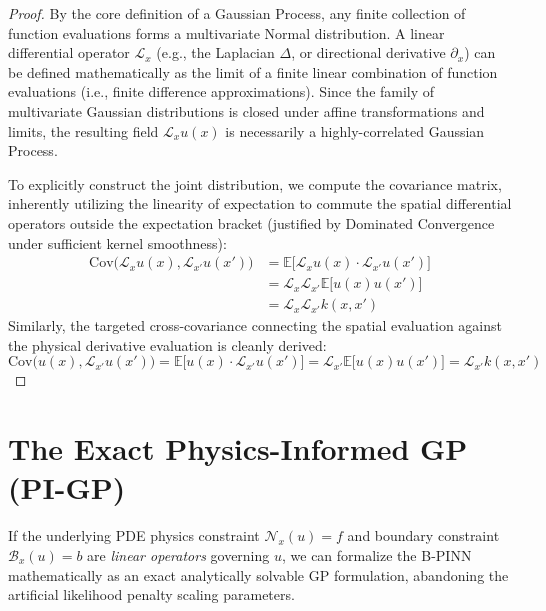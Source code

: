 \documentclass[11pt]{article}
\begin{document}
\begin{proof}
By the core definition of a Gaussian Process, any finite collection of function evaluations forms a multivariate Normal distribution. A linear differential operator $\mathcal{L}_x$ (e.g., the Laplacian $\Delta$, or directional derivative $\partial_x$) can be defined mathematically as the limit of a finite linear combination of function evaluations (i.e., finite difference approximations). Since the family of multivariate Gaussian distributions is closed under affine transformations and limits, the resulting field $\mathcal{L}_x u(x)$ is necessarily a highly-correlated Gaussian Process.

To explicitly construct the joint distribution, we compute the covariance matrix, inherently utilizing the linearity of expectation to commute the spatial differential operators outside the expectation bracket (justified by Dominated Convergence under sufficient kernel smoothness):
\begin{align}
\text{Cov}\big(\mathcal{L}_x u(x), \mathcal{L}_{x'} u(x')\big) &= \mathbb{E}\big[\mathcal{L}_x u(x) \cdot \mathcal{L}_{x'} u(x')\big] \nonumber \\
&= \mathcal{L}_x \mathcal{L}_{x'} \mathbb{E}\big[u(x) u(x')\big] \nonumber \\
&= \mathcal{L}_x \mathcal{L}_{x'} k(x, x') \label{eq:physics_covariance}
\end{align}
Similarly, the targeted cross-covariance connecting the spatial evaluation against the physical derivative evaluation is cleanly derived:
\begin{equation}
\text{Cov}\big(u(x), \mathcal{L}_{x'} u(x')\big) = \mathbb{E}\big[u(x) \cdot \mathcal{L}_{x'} u(x')\big] = \mathcal{L}_{x'} \mathbb{E}\big[u(x) u(x')\big] = \mathcal{L}_{x'} k(x, x') \label{eq:cross_covariance}
\end{equation}
\end{proof}

\section{The Exact Physics-Informed GP (PI-GP)}

If the underlying PDE physics constraint $\mathcal{N}_x(u)=f$ and boundary constraint $\mathcal{B}_x(u)=b$ are \emph{linear operators} governing $u$, we can formalize the B-PINN mathematically as an exact analytically solvable GP formulation, abandoning the artificial likelihood penalty scaling parameters.
\end{document}
